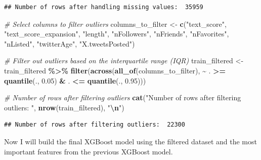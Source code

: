 \documentclass[
]{article}
\newenvironment{Shaded}{\begin{snugshade}}{\end{snugshade}}
\newcommand{\CommentTok}[1]{\textcolor[rgb]{0.56,0.35,0.01}{\textit{#1}}}
\newcommand{\FloatTok}[1]{\textcolor[rgb]{0.00,0.00,0.81}{#1}}
\newcommand{\FunctionTok}[1]{\textcolor[rgb]{0.13,0.29,0.53}{\textbf{#1}}}
\newcommand{\NormalTok}[1]{#1}
\newcommand{\OtherTok}[1]{\textcolor[rgb]{0.56,0.35,0.01}{#1}}
\newcommand{\SpecialCharTok}[1]{\textcolor[rgb]{0.81,0.36,0.00}{\textbf{#1}}}
\newcommand{\StringTok}[1]{\textcolor[rgb]{0.31,0.60,0.02}{#1}}
\begin{document}
\begin{verbatim}
## Number of rows after handling missing values:  35959
\end{verbatim}

\begin{Shaded}
\begin{Highlighting}[]
\CommentTok{\# Select columns to filter outliers}
\NormalTok{columns\_to\_filter }\OtherTok{\textless{}{-}} \FunctionTok{c}\NormalTok{(}\StringTok{"text\_score"}\NormalTok{, }\StringTok{"text\_score\_expansion"}\NormalTok{,}
  \StringTok{"length"}\NormalTok{, }\StringTok{"nFollowers"}\NormalTok{, }\StringTok{"nFriends"}\NormalTok{,}
  \StringTok{"nFavorites"}\NormalTok{, }\StringTok{"nListed"}\NormalTok{, }\StringTok{"twitterAge"}\NormalTok{, }\StringTok{"X.tweetsPosted"}\NormalTok{)}

\CommentTok{\# Filter out outliers based on the interquartile range (IQR)}
\NormalTok{train\_filtered }\OtherTok{\textless{}{-}}\NormalTok{ train\_filtered }\SpecialCharTok{\%\textgreater{}\%}
  \FunctionTok{filter}\NormalTok{(}\FunctionTok{across}\NormalTok{(}\FunctionTok{all\_of}\NormalTok{(columns\_to\_filter), }\SpecialCharTok{\textasciitilde{}}\NormalTok{ . }\SpecialCharTok{\textgreater{}=} \FunctionTok{quantile}\NormalTok{(., }\FloatTok{0.05}\NormalTok{) }\SpecialCharTok{\&}\NormalTok{ . }\SpecialCharTok{\textless{}=} \FunctionTok{quantile}\NormalTok{(., }\FloatTok{0.95}\NormalTok{)))}

\CommentTok{\# Number of rows after filtering outliers}
\FunctionTok{cat}\NormalTok{(}\StringTok{"Number of rows after filtering outliers: "}\NormalTok{, }\FunctionTok{nrow}\NormalTok{(train\_filtered), }\StringTok{"}\SpecialCharTok{\textbackslash{}n}\StringTok{"}\NormalTok{)}
\end{Highlighting}
\end{Shaded}

\begin{verbatim}
## Number of rows after filtering outliers:  22300
\end{verbatim}

Now I will build the final XGBoost model using the filtered dataset and
the most important features from the previous XGBoost model.
\end{document}
